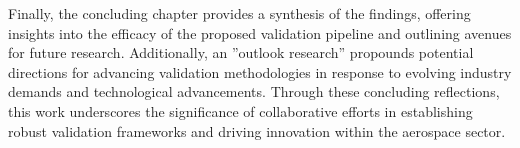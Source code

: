 %
\indent Finally, the concluding chapter provides a synthesis of the findings, offering insights into the efficacy of the proposed validation pipeline and outlining avenues for future research. Additionally, an ''outlook research'' propounds potential directions for advancing validation methodologies in response to evolving industry demands and technological advancements. Through these concluding reflections, this work underscores the significance of collaborative efforts in establishing robust validation frameworks and driving innovation within the aerospace sector.
